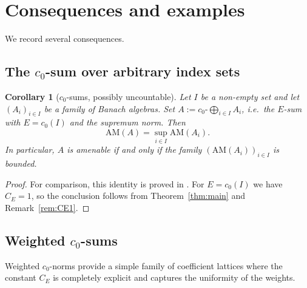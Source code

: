 \documentclass[reqno]{amsart}
\theoremstyle{plain}
\newtheorem{corollary}[theorem]{Corollary}
\theoremstyle{definition}
\theoremstyle{remark}
\newcommand{\AM}{\mathrm{AM}}
\begin{document}
\section{Consequences and examples}\label{sec:applications}

We record several consequences.

\subsection{The $c_0$-sum over arbitrary index sets}

\begin{corollary}[$c_0$-sums, possibly uncountable]\label{cor:c0}
Let $I$ be a non-empty set and let $(A_i)_{i\in I}$ be a family of Banach algebras.
Set $A:=c_0\text{-}\bigoplus_{i\in I}A_i$, i.e.\ the $E$-sum with $E=c_0(I)$ and the supremum norm.
Then
\[
\AM(A)=\sup_{i\in I}\AM(A_i).
\]
In particular, $A$ is amenable if and only if the family $(\AM(A_i))_{i\in I}$ is bounded.
\end{corollary}

\begin{proof}
For comparison, this identity is proved in \cite[Proposition~2.3.19]{Runde2020ABA}.
For $E=c_0(I)$ we have $C_E=1$, so the conclusion follows from Theorem~\ref{thm:main} and Remark~\ref{rem:CE1}.
\end{proof}

\subsection{Weighted $c_0$-sums}

Weighted $c_0$-norms provide a simple family of coefficient lattices where the
constant $C_E$ is completely explicit and captures the uniformity of the weights.
\end{document}
